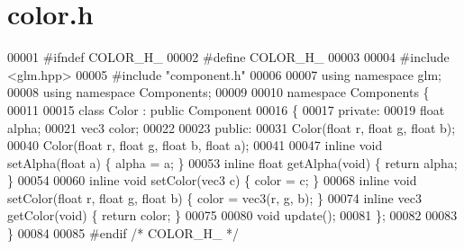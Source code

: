 \section{color.\+h}
\label{color_8h_source}

\begin{DoxyCode}
00001 \textcolor{preprocessor}{#ifndef COLOR\_H\_}
00002 \textcolor{preprocessor}{#define COLOR\_H\_}
00003 
00004 \textcolor{preprocessor}{#include <glm.hpp>}
00005 \textcolor{preprocessor}{#include "component.h"}
00006 
00007 \textcolor{keyword}{using namespace }glm;
00008 \textcolor{keyword}{using namespace }Components;
00009 
00010 \textcolor{keyword}{namespace }Components \{    
00011 
00015     \textcolor{keyword}{class }Color : \textcolor{keyword}{public} Component
00016     \{
00017     \textcolor{keyword}{private}:
00019         \textcolor{keywordtype}{float}   alpha;
00021         vec3    color;
00022 
00023     \textcolor{keyword}{public}:
00031         Color(\textcolor{keywordtype}{float} r, \textcolor{keywordtype}{float} g, \textcolor{keywordtype}{float} b);
00040         Color(\textcolor{keywordtype}{float} r, \textcolor{keywordtype}{float} g, \textcolor{keywordtype}{float} b, \textcolor{keywordtype}{float} a);
00041 
00047         \textcolor{keyword}{inline} \textcolor{keywordtype}{void}  setAlpha(\textcolor{keywordtype}{float} a) \{ alpha = a;    \}
00053         \textcolor{keyword}{inline} \textcolor{keywordtype}{float} getAlpha(\textcolor{keywordtype}{void})    \{ \textcolor{keywordflow}{return} alpha; \}
00054 
00060         \textcolor{keyword}{inline} \textcolor{keywordtype}{void}  setColor(vec3 c)                     \{ color = c; \}
00068         \textcolor{keyword}{inline} \textcolor{keywordtype}{void}  setColor(\textcolor{keywordtype}{float} r, \textcolor{keywordtype}{float} g, \textcolor{keywordtype}{float} b)  \{ color = vec3(r, g, b); \}
00074         \textcolor{keyword}{inline} vec3  getColor(\textcolor{keywordtype}{void})                       \{ \textcolor{keywordflow}{return} color; \}
00075 
00080         \textcolor{keywordtype}{void} update();
00081     \};
00082 
00083 \}
00084 
00085 \textcolor{preprocessor}{#endif }\textcolor{comment}{/* COLOR\_H\_ */}\textcolor{preprocessor}{}
\end{DoxyCode}
